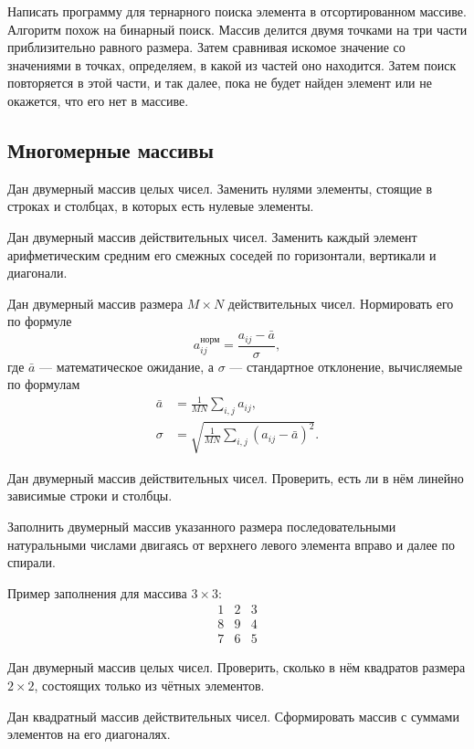 \task Написать программу для тернарного поиска элемента в
отсортированном массиве. Алгоритм похож на бинарный поиск. Массив
делится двумя точками на три части приблизительно равного
размера. Затем сравнивая искомое значение со значениями в точках,
определяем, в какой из частей оно находится. Затем поиск повторяется в
этой части, и так далее, пока не будет найден элемент или не окажется,
что его нет в массиве.


\subsection{Многомерные массивы}

\task Дан двумерный массив целых чисел. Заменить нулями элементы,
стоящие в строках и столбцах, в которых есть нулевые элементы.

\task Дан двумерный массив действительных чисел. Заменить каждый элемент
арифметическим средним его смежных соседей по горизонтали, вертикали и
диагонали.

\task Дан двумерный массив размера $M\times N$ действительных
чисел. Нормировать его по формуле
\[
a_{ij}^\textrm{норм} = \frac{a_{ij}-\bar{a}}{\sigma},
\]
где $\bar{a}$ — математическое ожидание, а $\sigma$ — стандартное
отклонение, вычисляемые по формулам
\begin{align*}
  \bar{a} &= \frac{1}{MN}\sum_{i,j}a_{ij},\\
  \sigma  &= \sqrt{\frac{1}{MN}\sum_{i,j}(a_{ij}-\bar{a})^2}. 
\end{align*}

\task Дан двумерный массив действительных чисел. Проверить, есть ли в
нём линейно зависимые строки и столбцы.

\task Заполнить двумерный массив указанного размера последовательными
натуральными числами двигаясь от верхнего левого элемента вправо и
далее по спирали.

Пример заполнения для массива $3\times 3$:
\[
\begin{array}{ccc}
  1 & 2 & 3 \\
  8 & 9 & 4 \\
  7 & 6 & 5
\end{array}
\]

\task Дан двумерный массив целых чисел. Проверить, сколько в нём
квадратов размера $2\times 2$, состоящих только из чётных элементов.

\task Дан квадратный массив действительных чисел. Сформировать массив
с суммами элементов на его диагоналях.

